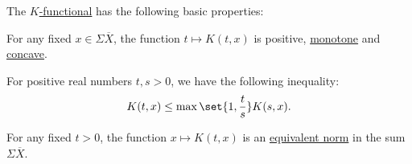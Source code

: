 \begin{proposition}\label{def:k_functional_properties}
  The \hyperref[def:k_functional]{\( K \)-functional} has the following basic properties:

  \begin{thmenum}
     For any fixed \( x \in \Sigma \overline{X} \), the function \( t \mapsto K(t, x) \) is positive, \hyperref[def:partially_ordered_set/homomorphism]{monotone} and \hyperref[def:convex_functions]{concave}.

     For positive real numbers \( t, s > 0 \), we have the following inequality:
    \begin{equation}\label{eq:def:k_functional_properties/inequality}
      K(t, x) \leq \max\set{1, \frac t s} K(s, x).
    \end{equation}

     For any fixed \( t > 0 \), the function \( x \mapsto K(t, x) \) is an \hyperref[def:equivalent_metrics]{equivalent norm} in the sum \( \Sigma \overline{X} \).
  \end{thmenum}
\end{proposition}
